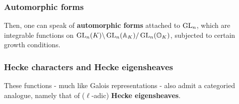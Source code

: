 \documentclass{beamer}
\begin{document}
    \begin{frame}
        \frametitle{Automorphic forms}
        
        Then, one can speak of \textbf{automorphic forms} attached to $\operatorname{GL}_n$, which are integrable functions on $\operatorname{GL}_n(K)\backslash\operatorname{GL}_n(\mathbb{A}_K)/\operatorname{GL}_n(\mathbb{O}_K)$, subjected to certain growth conditions.
    \end{frame}
    
    \begin{frame}
        \frametitle{Hecke characters and Hecke eigensheaves}
        
        These functions - much like Galois representations - also admit a categoried analogue, namely that of ($\ell$-adic) \textbf{Hecke eigensheaves}. 
    \end{frame}
    
    \begin{frame}
        \frametitle{}
    \end{frame}
\end{document}
